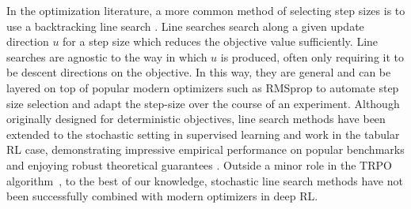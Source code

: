 \documentclass{article}
\newcommand{\update}{u}
\newcommand{\stepSize}{\eta}
\newcommand{\inner}[2]{\langle #1, #2 \rangle}
\begin{document}
In the optimization literature, a more common method of selecting step sizes is to use a backtracking
line search \citep{nocedal2006numerical}. Line searches search along a given update direction $\update$ for a step size
which reduces the objective value sufficiently.
Line searches are agnostic to the way in which $u$ is produced, often only requiring it to be descent directions on the objective. In this way, they are 
general and can be layered on top of popular modern optimizers such as RMSprop \citep{Hinton2012lecture} to automate step size selection and adapt the step-size over the course of an experiment.
Although originally designed for deterministic objectives, line search methods have been
extended to the stochastic setting in supervised learning and work in the tabular RL case, demonstrating impressive empirical performance on
popular benchmarks and enjoying robust theoretical guarantees \citep{lu2024towards,vaswani2019painless,galli2023monotone,shea2024so,vaswani2020adaptive,fox2024glocal,vaswani2025armijo,fan2023bisls,jiang2023adaptive}. Outside a minor role in the TRPO algorithm~\citep{schulman2017trust}, to the best of our knowledge, stochastic line search methods have not been successfully combined with modern optimizers in deep RL. 
\end{document}
